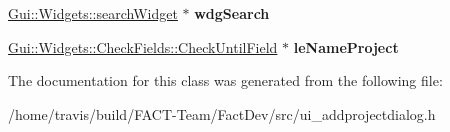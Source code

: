 \begin{DoxyCompactItemize}
\item 
\hypertarget{classUi__AddProjectDialog_acb0308f4c8cf415a39ba489253a0b326}{\hyperlink{classGui_1_1Widgets_1_1searchWidget}{Gui\-::\-Widgets\-::search\-Widget} $\ast$ {\bfseries wdg\-Search}}\label{classUi__AddProjectDialog_acb0308f4c8cf415a39ba489253a0b326}

\item 
\hypertarget{classUi__AddProjectDialog_ae5ba52156e8745d825055b37b37f11ef}{\hyperlink{classGui_1_1Widgets_1_1CheckFields_1_1CheckUntilField}{Gui\-::\-Widgets\-::\-Check\-Fields\-::\-Check\-Until\-Field} $\ast$ {\bfseries le\-Name\-Project}}\label{classUi__AddProjectDialog_ae5ba52156e8745d825055b37b37f11ef}

\end{DoxyCompactItemize}


The documentation for this class was generated from the following file\-:\begin{DoxyCompactItemize}
\item 
/home/travis/build/\-F\-A\-C\-T-\/\-Team/\-Fact\-Dev/src/ui\-\_\-addprojectdialog.\-h\end{DoxyCompactItemize}
